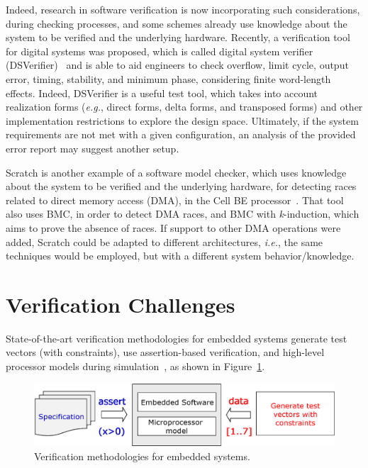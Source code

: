\documentclass{acm_sen_article}
\begin{document}
Indeed, research in software verification is now incorporating such considerations, during checking processes, and some schemes already use knowledge about the system to be verified and the underlying hardware. Recently, a verification tool for digital systems was proposed, which is called digital system verifier (DSVerifier)~\cite{dsv_spin2015} and is able to aid engineers to check overflow, limit cycle, output error, timing, stability, and minimum phase, considering finite word-length effects. Indeed, DSVerifier is a useful test tool, which takes into account realization forms ({\it e.g.}, direct forms, delta forms, and transposed forms) and other implementation restrictions to explore the design space. Ultimately, if the system requirements are not met with a given configuration, an analysis of the provided error report may suggest another setup. 

Scratch is another example of a software model checker, which uses knowledge about the system to be verified and the underlying hardware, for detecting races related to direct memory access (DMA), in the Cell BE processor~\cite{Donaldson10}. That tool also uses BMC, in order to detect DMA races, and BMC with \textit{k}-induction, which aims to prove the absence of races. If support to other DMA operations were added, Scratch could be adapted to different architectures, {\it i.e.}, the same techniques would be employed, but with a different system behavior/knowledge.

\section{Verification Challenges}

State-of-the-art verification methodologies for embedded systems generate test vectors (with constraints), use assertion-based verification, and high-level processor models during simulation~\cite{Behrend15,Lettnin09}, as shown in Figure~\ref{verification-methodologies}. 
%
\begin{figure}[h]
	\centering
	\includegraphics[scale=0.35]{figure2.eps}
	\caption{Verification methodologies for embedded systems.}
	\label{verification-methodologies}
\end{figure}
\end{document}
